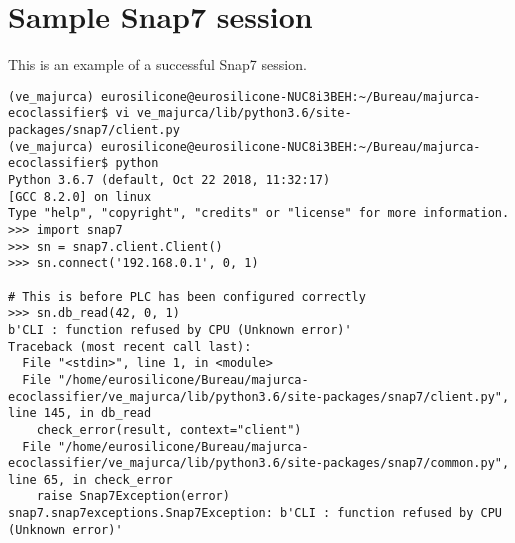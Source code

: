\chapter{Sample Snap7 session}
\label{chapter:snap7}

This is an example of a successful Snap7 session.

\begin{lstlisting}[style=Python-color,caption={Sample Snap7 session}]
(ve_majurca) eurosilicone@eurosilicone-NUC8i3BEH:~/Bureau/majurca-ecoclassifier$ vi ve_majurca/lib/python3.6/site-packages/snap7/client.py
(ve_majurca) eurosilicone@eurosilicone-NUC8i3BEH:~/Bureau/majurca-ecoclassifier$ python
Python 3.6.7 (default, Oct 22 2018, 11:32:17)
[GCC 8.2.0] on linux
Type "help", "copyright", "credits" or "license" for more information.
>>> import snap7
>>> sn = snap7.client.Client()
>>> sn.connect('192.168.0.1', 0, 1)

# This is before PLC has been configured correctly
>>> sn.db_read(42, 0, 1)
b'CLI : function refused by CPU (Unknown error)'
Traceback (most recent call last):
  File "<stdin>", line 1, in <module>
  File "/home/eurosilicone/Bureau/majurca-ecoclassifier/ve_majurca/lib/python3.6/site-packages/snap7/client.py", line 145, in db_read
    check_error(result, context="client")
  File "/home/eurosilicone/Bureau/majurca-ecoclassifier/ve_majurca/lib/python3.6/site-packages/snap7/common.py", line 65, in check_error
    raise Snap7Exception(error)
snap7.snap7exceptions.Snap7Exception: b'CLI : function refused by CPU (Unknown error)'


\end{lstlisting}
